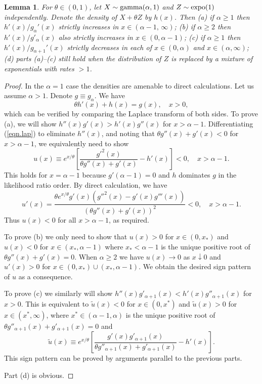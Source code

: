 \documentclass[11pt]{article}
\newtheorem{lemma}{\bf Lemma}
\begin{document}
\begin{lemma}
\label{lem.initial}
For $\theta\in (0, 1)$, let $X\sim {\rm gamma}(\alpha, 1)$ and $Z\sim {\rm expo}(1)$ independently.  Denote the density of $X + \theta Z$ by $h(x)$.  Then (a) if $\alpha \geq 1$ then $h'(x)/g_\alpha'(x)$ strictly increases in $x\in (\alpha -1,\, \infty)$; (b) if $\alpha \geq 2$ then $h'(x)/g'_\alpha(x)$ also strictly increases in $x\in (0, \alpha -1)$;  
 (c) if $\alpha \geq 1$ then $h'(x)/g_{\alpha +1}'(x)$ strictly decreases in each of $x\in (0, \alpha)$ and $x\in (\alpha, \infty)$; (d) parts (a)--(c) still hold when the distribution of $Z$ is replaced by a mixture of exponentials with rates $> 1$.
\end{lemma}
\begin{proof}
In the $\alpha=1$ case the densities are amenable to direct calculations.  Let us assume $\alpha>1$.  Denote $g\equiv g_\alpha$.  We have 
\begin{equation}
\label{eqn.lap}
\theta h'(x) + h(x) = g(x),\quad x>0,
\end{equation}
which can be verified by comparing the Laplace transform of both sides.  To prove (a), we will show $h''(x) g'(x) > h'(x) g''(x) $ for $x> \alpha -1$.  Differentiating (\ref{eqn.lap}) to eliminate $h''(x)$, and noting that $\theta g''(x) +g'(x)<0$ for $x>\alpha -1$, we equivalently need to show 
\begin{equation}
\label{eqn.u1}
u(x)\equiv e^{x/\theta}  \left[\frac{g'^2(x)}{\theta g''(x) +g'(x)}-h'(x)\right] <0,\quad x>\alpha-1.
\end{equation}
This holds for $x=\alpha -1$ because $g'(\alpha -1)=0$ and $h$ dominates $g$ in the likelihood ratio order.  By direct calculation, we have 
\begin{equation}
\label{eqn.u2}
u'(x) = \frac{\theta e^{x/\theta} g'(x)(g''^2(x) - g'(x) g'''(x))}{(\theta g''(x) +g'(x))^2} <0,\quad x>\alpha -1.
\end{equation}
Thus $u(x)<0$ for all $x>\alpha -1$, as required.

To prove (b) we only need to show that $u(x)>0$ for $x\in (0, x_*)$ and $u(x)<0$ for $x\in (x_*, \alpha -1)$ where $x_*<\alpha -1 $ is the unique positive root of $\theta g''(x) +g'(x)=0$.  When $\alpha \geq 2$ we have $u(x)\to 0$ as $x\downarrow 0$ and $u'(x)>0$ for $x\in (0, x_*)\cup (x_*, \alpha -1)$. We obtain the desired sign pattern of $u$ as a consequence.

To prove (c) we similarly will show $h''(x)g'_{\alpha+1}(x) < h'(x) g''_{\alpha+1}(x)$ for $x>0$.  This is equivalent to $\tilde{u}(x)<0$ for $x\in (0, x^*)$ and $\tilde{u}(x)>0$ for $x\in (x^*, \infty)$, where $x^*\in (\alpha -1, \alpha)$ is the unique positive root of $\theta g''_{\alpha+1}(x) +g'_{\alpha+1}(x)=0$ and 
$$\tilde{u}(x)\equiv e^{x/\theta}  \left[\frac{g'(x)g'_{\alpha+1}(x)}{\theta g''_{\alpha+1}(x) +g'_{\alpha+1}(x)}-h'(x)\right].$$
This sign pattern can be proved by arguments parallel to the previous parts.

Part (d) is obvious.
 \end{proof}
\end{document}
